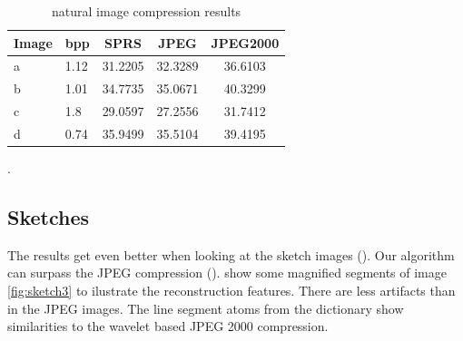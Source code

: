 \begin{table}[h]
\centering

\begin{tabular}{| l l | c | c | c|}
\hline\hline
Image & bpp & SPRS & JPEG & JPEG2000 \\
\hline
a & 1.12 & 31.2205 & 32.3289 & 36.6103 \\
b & 1.01 & 34.7735 & 35.0671 & 40.3299 \\
c & 1.8  & 29.0597 & 27.2556 & 31.7412 \\
d & 0.74  & 35.9499 & 35.5104 & 39.4195 \\
\hline
\end{tabular}
\caption{natural image compression results}
\label{tab:compression1}.
\end{table}





\newpage
\subsection{Sketches}
The results get even better when looking at the sketch images
(). Our algorithm can surpass the JPEG compression
().  show some magnified
segments of image \ref{fig:sketch3} to ilustrate the reconstruction features.
There are less artifacts than in the JPEG images. The line segment atoms from
the dictionary show similarities to the wavelet based JPEG 2000 compression.

